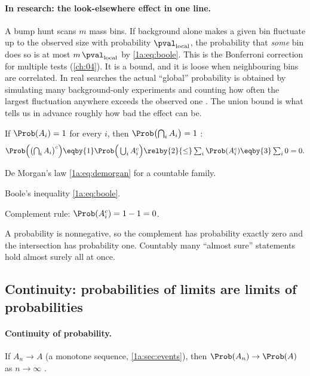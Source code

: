 \paragraph{In research: the look-elsewhere effect in one line.}
A bump hunt scans $m$ mass bins. If background alone makes a given bin
fluctuate up to the observed size with probability $\pval_{\text{local}}$, the
probability that \emph{some} bin does so is at most $m\,\pval_{\text{local}}$ by
\eqref{1a:eq:boole}. This is the Bonferroni correction for multiple tests
(\cref{ch:04}). It is a bound, and it is loose when neighbouring bins are
correlated. In real searches the actual ``global'' probability is obtained by
simulating many background-only experiments and counting how often the largest
fluctuation anywhere exceeds the observed one \cite{GrossVitells2010}. The
union bound is what tells us in advance roughly how bad the effect can be.

\label{1a:ex:prob-one}
If $\Prob(A_i)=1$ for every $i$, then $\Prob\bigl(\bigcap_iA_i\bigr)=1$
:
\begin{align*}
\Prob\Bigl(\bigl(\textstyle\bigcap_iA_i\bigr)^c\Bigr)
\eqby{1}\Prob\Bigl(\,\bigcup_iA_i^c\Bigr)
\relby{2}{\le}\sum_i\Prob(A_i^c)
\eqby{3}\sum_i 0 = 0 .
\end{align*}
\begin{explain}
  \item De Morgan's law \eqref{1a:eq:demorgan} for a countable family.
  \item Boole's inequality \eqref{1a:eq:boole}.
  \item Complement rule: $\Prob(A_i^c)=1-1=0$.
\end{explain}
A probability is nonnegative, so the complement has probability exactly zero
and the intersection has probability one. Countably many ``almost sure''
statements hold almost surely all at once.

\subsection{Continuity: probabilities of limits are limits of probabilities}

\paragraph{Continuity of probability.}
If $A_n\to A$ (a monotone sequence, \cref{1a:sec:events}), then
$\Prob(A_n)\to\Prob(A)$ as $n\to\infty$ .

